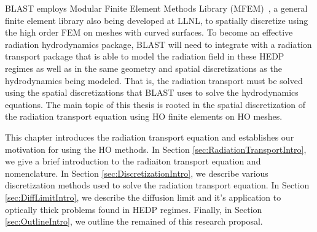\documentclass{article}
\begin{document}
BLAST employs Modular Finite Element Methods Library (MFEM)~\cite{MFEM_Web}, a general finite element library also being developed at LLNL, to spatially discretize using the high order FEM on meshes with curved surfaces. To  become an effective radiation hydrodynamics package, BLAST will need to integrate with a radiation transport package that is able to model the radiation field in these HEDP regimes as well as in the same geometry and spatial discretizations as the hydrodynamics being modeled. That is, the radiation transport must be solved using the spatial discretizations that BLAST uses to solve the hydrodynamics equations. The main topic of this thesis is rooted in the spatial discretization of the radiation transport equation using HO finite elements on HO meshes.

This chapter introduces the radiation transport equation and establishes our motivation for using the HO methods. In Section \ref{sec:RadiationTransportIntro}, we give a brief introduction to the radiaiton transport equation and nomenclature. In Section \ref{sec:DiscretizationIntro}, we describe various discretization methods used to solve the radiation transport equation. In Section \ref{sec:DiffLimitIntro}, we describe the diffusion limit and it's application to optically thick problems found in HEDP regimes. Finally, in Section \ref{sec:OutlineIntro}, we outline the remained of this research proposal.

\end{document}
